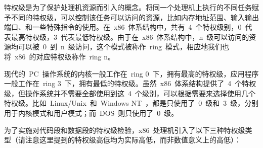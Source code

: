 特权级是为了保护处理机资源而引入的概念。将同一个处理机上执行的不同任务赋予不同的特权级，可以控制该任务可以访问的资源，比如内存地址范围、输入输出端口、和一些特殊指令的使用。在~x86~体系结构中，共有~4~个特权级别，0~代表最高特权级，3~代表最低特权级。由于在~x86~体系结构中，n~级可以访问的资源均可以被~0~到~n~级访问，这个模式被称作~ring~模式，相应地我们也将~x86~的对应特权级称作~ring n。

现代的~PC~操作系统的内核一般工作在~ring 0~下，拥有最高的特权级，应用程序一般工作在~ring 3~下，拥有最低的特权级。虽然~x86~体系结构提供了~4~个特权级，但操作系统并不需要全部使用到这~4~个级别，可以根据需要来选择使用几个特权级。比如~Linux/Unix~和~Windows NT~，都是只使用了~0~级和~3~级，分别用于内核模式和用户模式；而~DOS~则只使用了~0~级。

为了实施对代码段和数据段的特权级检验，x86~处理机引入了以下三种特权级类型（请注意这里提到的特权级高低均为实际高低，而非数值意义上的高低）：

